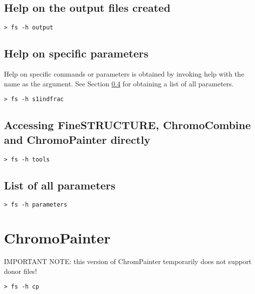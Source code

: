 \documentclass[11pt]{article}
\begin{document}
\subsection{Help on the output files created}
\begin{lstlisting}[caption=Help on what output files are created and in which stage]
> fs -h output
\end{lstlisting}


\subsection{Help on specific parameters}
Help on specific commands or parameters is obtained by invoking help with the name as the argument.  See Section \ref{subsec:parameters} for obtaining a list of all parameters.
\begin{lstlisting}[caption=Example for accessing the help about a parameter]
> fs -h s1indfrac
\end{lstlisting}


\subsection{Accessing FineSTRUCTURE, ChromoCombine and ChromoPainter directly}
\begin{lstlisting}[caption=Help on accessing the tools]
> fs -h tools
\end{lstlisting}


\subsection{List of all parameters}
\label{subsec:parameters}
\begin{lstlisting}[caption=Help on all parameters that can be set]
> fs -h parameters
\end{lstlisting}


\section{ChromoPainter}
IMPORTANT NOTE: this version of ChromPainter temporarily does not support donor files!
\begin{lstlisting}[caption=ChromoPainter help]
> fs -h cp
\end{lstlisting}

\end{document}

